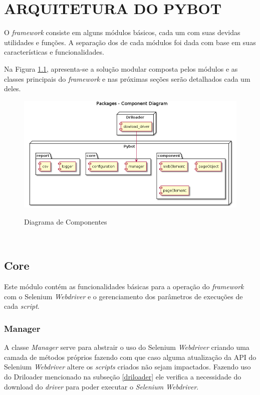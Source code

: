 %
%
\chapter{ARQUITETURA DO PYBOT}\label{chap:imp}
    O \emph{framework} consiste em alguns módulos básicos, cada um com suas devidas utilidades e funções.
    A separação dos de cada módulos foi dada com base em suas características e funcionalidades.

    Na Figura \ref{fig:modules}, apresenta-se a solução modular composta pelos módulos e as classes principais do
    \emph{framework} e nas próximas seções serão detalhados cada um deles.


    \begin{figure}[H]
        \vspace*{0,3cm}
        \centering
        \caption{Diagrama de Componentes}
        \includegraphics[width=1\textwidth]{./04-figuras/model}
        \label{fig:modules}
    \end{figure}~\vspace*{-0,9cm}~{\raggedright {}}


    \section{Core}
        Este módulo contém as funcionalidades básicas para a operação do \emph{framework} com o Selenium \emph{Webdriver}
        e o gerenciamento dos parâmetros de execuções de cada \emph{script}.

        \subsection{Manager} \label{sec:manager}
        A classe \emph{Manager} serve para abstrair o uso do Selenium \emph{Webdriver} criando uma camada de métodos próprios fazendo com que caso alguma
        atualização da API do Selenium \emph{Webdriver} altere os \emph{scripts} criados não sejam impactados. Fazendo uso do Driloader mencionado na
        subseção \ref{driloader} ele verifica a necessidade do download do \emph{driver} para poder executar o \emph{Selenium Webdriver}.

